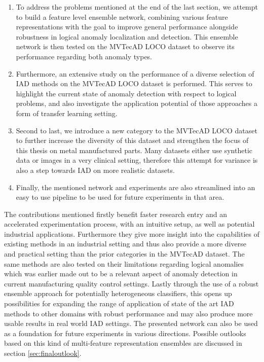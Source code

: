 \begin{enumerate}
  \item To address the problems mentioned at the end of the last section, we attempt 
  to build a feature level ensemble network, combining various feature representations with the goal to improve 
  general performance alongside robustness in logical anomaly localization and detection. This ensemble network is then tested on 
  the MVTecAD LOCO \cite{LOCO...} dataset to observe its performance regarding both anomaly types.
  \item Furthermore, an extensive study on the performance of a diverse selection of IAD methods on the MVTecAD LOCO dataset is performed. 
  This serves to highlight the current state of anomaly detection with respect to logical problems, and also investigate the application potential of 
  those approaches a form of transfer learning setting.
  \item Second to last, we introduce a new category to the MVTecAD LOCO dataset to further increase the diversity of this dataset and strengthen the focus 
  of this thesis on metal manufactured parts. Many datasets either use synthetic data or images in a very clinical setting, therefore this 
  attempt for variance is also a step towards IAD on more realistic datasets.
  \item Finally, the mentioned network and experiments are also streamlined into an easy to use pipeline 
  to be used for future experiments in that area.
\end{enumerate}

The contributions mentioned firstly benefit faster research entry and an accelerated experimentation process, with an intuitive setup, 
as well as potential industrial applications. 
Furthermore they give more insight into the capabilities of existing methods in an industrial setting and thus also provide a more 
diverse and practical setting than the prior categories in the MVTecAD \cite{LOCODentsAndScratchesBergmann2022} dataset. The same methods are also tested on their limitations 
regarding logical anomalies which was earlier made out to be a relevant aspect of anomaly detection in current manufacturing quality control 
settings. Lastly through the use of a robust ensemble approach for potentially heterogeneous classifiers, this opens up possibilities for expanding 
the range of application of state of the art IAD methods to other domains with robust performance and may also produce more usable results in real 
world IAD settings. The presented network can also be used as a foundation for future experiments in 
various directions. Possible outlooks based on this kind of multi-feature representation ensembles are discussed in section \ref{sec:finaloutlook}.
\newline
\newline

